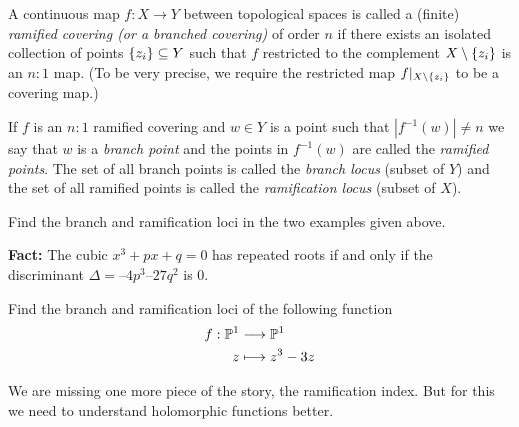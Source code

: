 \documentclass{article}
\begin{document}
\begin{definition}
  A continuous map $f: X \rightarrow Y$ between topological spaces is called a (finite) \emph{ramified covering (or a branched covering)} of order $n$ if there exists an isolated collection of points $\left\{z_i\right\} \subseteq Y$ such that $f$ restricted to the complement $X \setminus \left\{z_i\right\}$ is an $n:1$ map. (To be very precise, we require the restricted map $f|_{X \setminus \left\{z_i\right\}}$ to be a covering map.)

  If $f$ is an $n:1$ ramified covering and $w \in Y$ is a point such that $|f^{-1}(w)| \neq n$ we say that $w$ is a \emph{branch point} and the points in $f^{-1}(w)$ are called the \emph{ramified points}.
  The set of all branch points is called the \emph{branch locus} (subset of $Y$) and the set of all ramified points is called the \emph{ramification locus} (subset of $X$).
\end{definition}

\begin{qbox}
  Find the branch and ramification loci in the two examples given above.
\end{qbox}

\begin{qbox}
  \textbf{Fact:} The cubic $x^3 + px + q = 0$ has repeated roots if and only if the discriminant $\Delta = – 4p^3 – 27q^2$ is 0.

  Find the branch and ramification loci of the following function
  \begin{align*}
    f: \mathbb{P}^1 &\longrightarrow \mathbb{P}^1 \\
    z &\longmapsto z^3 - 3 z
  \end{align*}
\end{qbox}
We are missing one more piece of the story, the ramification index. But for this we need to understand holomorphic functions better.
\end{document}
